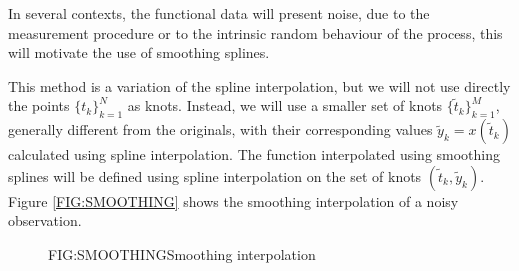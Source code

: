 In several contexts, the functional data will present noise, due to the
measurement procedure or to the intrinsic random behaviour of the process,
this will motivate the use of smoothing splines.

This method is a variation of the spline interpolation, but we will not
use directly the points $\{t_k\}_{k=1}^{N}$ as knots. Instead, we will use a
smaller set of knots $\{\tilde t_k\}_{k=1}^{M}$, generally different from the
originals, with their corresponding values $\tilde y_k = x(\tilde t_k)$
calculated using spline interpolation. The function interpolated using smoothing
splines will be defined using spline interpolation on the set of knots
$(\tilde t_k, \tilde y_k)$. Figure \ref{FIG:SMOOTHING} shows the smoothing
interpolation of a noisy observation.

\begin{figure}[Example of smoothing]{FIG:SMOOTHING}{Smoothing interpolation}
 \quad
{}
\end{figure}
